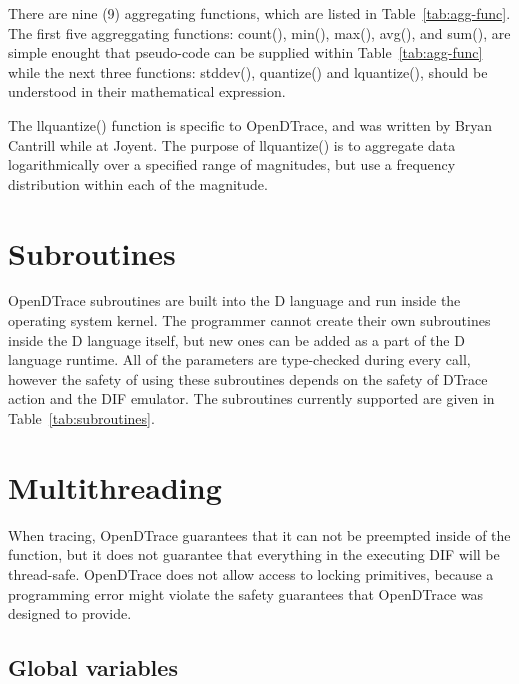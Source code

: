 There are nine (9) aggregating functions, which are listed in
Table~\ref{tab:agg-func}.  The first five aggreggating functions:
count(), min(), max(), avg(), and sum(), are simple enought that
pseudo-code can be supplied within Table~\ref{tab:agg-func} while the
next three functions: stddev(), quantize() and lquantize(), should be
understood in their mathematical expression.

The llquantize() function is specific to OpenDTrace, and was written
by Bryan Cantrill while at Joyent.  The purpose of llquantize() is to
aggregate data logarithmically over a specified range of magnitudes,
but use a frequency distribution within each of the magnitude.

\section{Subroutines}
\label{sec:subroutines}

OpenDTrace subroutines are built into the D language and run inside the
operating system kernel. The programmer cannot create their own subroutines
inside the D language itself, but new ones can be added as a part of the D
language runtime. All of the parameters are type-checked during every call,
however the safety of using these subroutines depends on the safety of DTrace
action and the DIF emulator. The subroutines currently supported are given
in Table~\ref{tab:subroutines}.

\section{Multithreading}


When tracing, OpenDTrace guarantees that it can not be preempted
inside of the  function, but it does not
guarantee that everything in the executing DIF will be thread-safe.
OpenDTrace does not allow access to locking primitives, because a
programming error might violate the safety guarantees that OpenDTrace
was designed to provide.

\subsection{Global variables}

